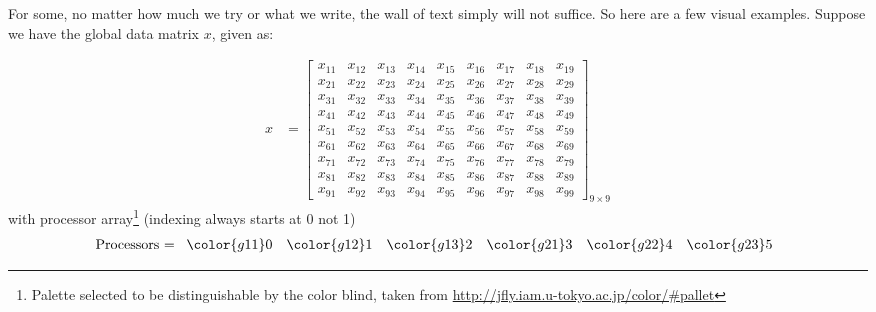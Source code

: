 For some, no matter how much we try or what we write, the wall of text
simply will not suffice. So here are a few visual examples. Suppose we
have the global data matrix $x$, given as:

\begin{align*}
x &= \left[
      \begin{array}{lllllllll}
      x_{11} & x_{12} & x_{13} & x_{14} & x_{15} & x_{16} & x_{17} & x	_{18} & x_{19}\\
      x_{21} & x_{22} & x_{23} & x_{24} & x_{25} & x_{26} & x_{27} & x	_{28} & x_{29}\\
      x_{31} & x_{32} & x_{33} & x_{34} & x_{35} & x_{36} & x_{37} & x	_{38} & x_{39}\\
      x_{41} & x_{42} & x_{43} & x_{44} & x_{45} & x_{46} & x_{47} & x	_{48} & x_{49}\\
      x_{51} & x_{52} & x_{53} & x_{54} & x_{55} & x_{56} & x_{57} & x	_{58} & x_{59}\\
      x_{61} & x_{62} & x_{63} & x_{64} & x_{65} & x_{66} & x_{67} & x	_{68} & x_{69}\\
      x_{71} & x_{72} & x_{73} & x_{74} & x_{75} & x_{76} & x_{77} & x	_{78} & x_{79}\\
      x_{81} & x_{82} & x_{83} & x_{84} & x_{85} & x_{86} & x_{87} & x	_{88} & x_{89}\\
      x_{91} & x_{92} & x_{93} & x_{94} & x_{95} & x_{96} & x_{97} & x	_{98} & x_{99}
      \end{array}
\right]_{9\times 9}
\end{align*}
with processor array\footnote{Palette selected to be distinguishable by
the color blind, taken from
\url{http://jfly.iam.u-tokyo.ac.jp/color/\#pallet}}
(indexing always starts at 0 not 1)
\begin{align*}
\text{Processors = }
      \begin{array}{llllll}
      \color{g11}0 & \color{g12}1 & \color{g13}2 & \color{g21}3 & \color{g22}4 & \color{g23}5
      \end{array}
\end{align*}


